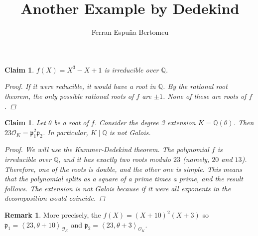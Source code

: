 \documentclass[11pt]{article}
\title{Another Example by Dedekind}
\author{Ferran Espuña Bertomeu}
\newtheorem{claim}[theorem]{Claim}
\theoremstyle{definition}
\newtheorem{rk}[theorem]{Remark}
\begin{document}
    \maketitle

    \begin{claim}
        $f(X)=X^3-X+1$ is irreducible over $\mathbb{Q}$.
        \begin{proof}
            If it were reducible, it would have a root in $\mathbb{Q}$.
            By the rational root theorem, the only possible rational roots of  $f$ are $\pm 1$.
            None of these are roots of $f$.
        \end{proof}
    \end{claim}

    \begin{claim}
        Let $\theta$ be a root of $f$.
        Consider the degree 3 extension $K = \mathbb{Q}(\theta)$.
        Then $23 \mathcal{O}_K = \mathfrak{p}_1^2 \mathfrak{p}_2$.
        In particular, $K\mid\mathbb{Q}$ is not Galois.
        \begin{proof}
            We will use the Kummer-Dedekind theorem.
            The polynomial $f$ is irreducible over $\mathbb{Q}$,
            and it has exactly two roots modulo $23$ (namely, $20$ and $13$).
            Therefore, one of the roots is double, and the other one is simple.
            This means that the polynomial splits as a square of a prime times a prime,
            and the result follows.
            The extension is not Galois because if it were all exponents in the decomposition would coincide.
        \end{proof}
    \end{claim}

    \begin{rk}
        More precisely, the $f(X) = (X+10)^2(X+3)$
        so
        $\mathfrak{p}_1 = \left<  23, \theta+10 \right>_{\mathcal{O}_K}$
        and
        $\mathfrak{p}_2 = \left<  23, \theta+3 \right>_{\mathcal{O}_K}$.
    \end{rk}
\end{document}

